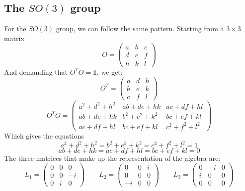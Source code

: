 \documentclass{article}
\begin{document}
\subsection{The $SO(3)$ group}
For the $SO(3)$ group, we can follow the same pattern. Starting from a $3\times3$ matrix
\begin{equation}
    O = \begin{pmatrix}
        a & b & c \\
        d & e & f \\
        h & k & l
    \end{pmatrix}
\end{equation}
And demanding that $O^TO = \mathbb{1}$, we get:
\begin{equation}
    O^T = \begin{pmatrix}
        a & d & h \\
        b & e & k \\
        c & f & l
    \end{pmatrix}
\end{equation}
\begin{equation}
    O^TO = \begin{pmatrix}
        a^2 + d^2 + h^2 & ab + de + hk & ac + df + hl \\
        ab + de + hk & b^2 + e^2 + k^2 & bc + ef + kl \\
        ac + df + hl & bc + ef + kl & c^2 + f^2 + l^2
    \end{pmatrix}
\end{equation}
Which gives the equations
\begin{equation}
    a^2 + d^2 + h^2 = b^2 + e^2 + k^2 = c^2 + f^2 + l^2 = 1
\end{equation}
\begin{equation}
    ab + de + hk = ac + df + hl = bc + ef + kl = 0
\end{equation}
The three matrices that make up the representation of the algebra are:
\begin{equation}
    L_1 = \begin{pmatrix}
        0 & 0 & 0 \\
        0 & 0 & -i \\
        0 & i & 0
    \end{pmatrix}
    \qquad
    L_2 = \begin{pmatrix}
        0 & 0 & i \\
        0 & 0 & 0 \\
        -i & 0 & 0
    \end{pmatrix}
    \qquad
    L_3 = \begin{pmatrix}
        0 & -i & 0 \\
        i & 0 & 0 \\
        0 & 0 & 0
    \end{pmatrix}
\end{equation}
\end{document}
